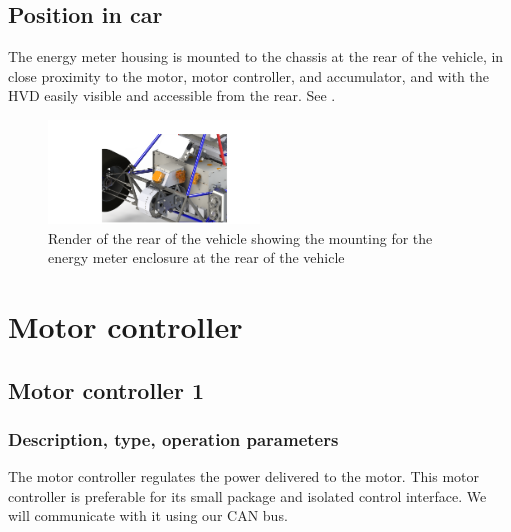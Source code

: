 \documentclass{article}
\begin{document}
\subsection{Position in car}
The energy meter housing is mounted to the chassis at the rear of the vehicle, in close proximity to the motor, motor controller, and accumulator, and with the HVD easily visible and accessible from the rear. See .

\begin{figure}
\centering
\includegraphics[width=0.5\textwidth]{EnergyMeterBackISO}
\caption{Render of the rear of the vehicle showing the mounting for the energy meter enclosure at the rear of the vehicle}
\label{fig:energy_meter_mounting_render}
\end{figure}


\section{Motor controller}\label{motor_controller}
\subsection{Motor controller 1}\label{motor_controller_1}
\subsubsection{Description, type, operation parameters}

The motor controller regulates the power delivered to the motor. This motor controller is preferable for its small package and isolated control interface. We will communicate with it using our CAN bus. 
\end{document}
